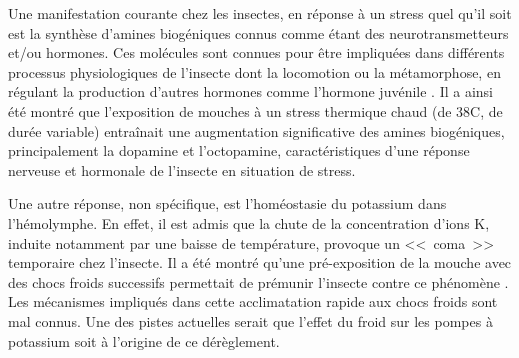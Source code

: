 		Une manifestation courante chez les insectes, en réponse à un stress quel qu'il soit est la synthèse d'amines biogéniques connus comme étant des neurotransmetteurs et/ou hormones.
		Ces molécules sont connues pour être impliquées dans différents processus physiologiques de l'insecte dont la locomotion ou la métamorphose, en régulant la production d'autres hormones comme l'hormone juvénile \cite{hirashima2000}.
		Il a ainsi été montré que l'exposition de mouches  à un stress thermique chaud (de 38\textdegree{}C, de durée variable) entraînait une augmentation significative des amines biogéniques, principalement la dopamine et l'octopamine, caractéristiques d'une réponse nerveuse et hormonale de l'insecte en situation de stress.

		Une autre réponse, non spécifique, est l'homéostasie du potassium dans l'hémolymphe.
		En effet, il est admis que la chute de la concentration d'ions K\up{+}, induite notamment par une baisse de température, provoque un <<~coma~>> temporaire chez l'insecte.
		Il a été montré qu'une pré-exposition de la mouche  avec des chocs froids successifs permettait de prémunir l'insecte contre ce phénomène \cite{armstrong2012}.
		Les mécanismes impliqués dans cette acclimatation rapide aux chocs froids sont mal connus.
		Une des pistes actuelles serait que l'effet du froid sur les pompes à potassium soit à l'origine de ce dérèglement.

